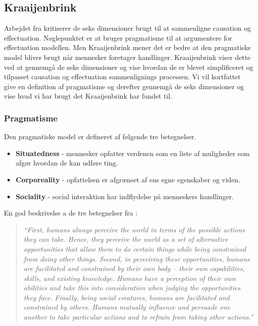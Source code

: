 \subsection{Kraaijenbrink}
Arbejdet fra \citet{kraaijenbrink2012nature} kritiserer de seks dimensioner brugt til at sammenligne causation og effectuation.
Nøglepunktet er at \citet{sarasvathy2001effectuation} bruger pragmatisme til at argumentere for effectuation modellen.
Men Kraaijenbrink mener det er bedre at den pragmatiske model bliver brugt når mennesker foretager handlinger.
Kraaijenbrink viser dette ved at gennemgå de seks dimensioner og vise hvordan de er blevet simplificeret og tilpasset causation og effectuation sammenlignings processen.
Vi vil kortfattet give en definition af pragmatisme og derefter gennemgå de seks dimensioner og vise hvad vi har brugt det Kraaijenbrink har fundet til.

\subsubsection{Pragmatisme}
Den pragmatiske model er defineret af følgende tre betegnelser.
\begin{itemize}
\item \textbf{Situatedness} - mennesker opfatter verdenen som en liste af muligheder som afgør hvordan de kan udføre ting.
\item \textbf{Corporeality} - opfattelsen er afgrænset af ens egne egenskaber og viden.
\item \textbf{Sociality} - social interaktion har indflydelse på menneskers handlinger.
\end{itemize}
En god beskrivelse a de tre betegnelser fra \citet[p.~195]{kraaijenbrink2012nature}:
\begin{quote}
  \textit{``First, humans always perceive the world in terms of the possible actions they can take. Hence, they perceive the world as a set of alternative opportunities that allow them to do certain things while being constrained from doing other things. Second, in perceiving these opportunities, humans are facilitated and constrained by their own body – their own capabilities, skills, and existing knowledge. Humans have a perception of their own abilities and take this into consideration when judging the opportunities they face. Finally, being social creatures, humans are facilitated and constrained by others. Humans mutually influence and persuade one another to take particular actions and to refrain from taking other actions.''}
\end{quote}

